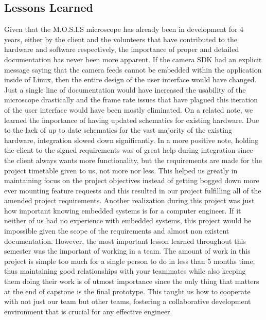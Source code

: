 \subsection{Lessons Learned}
Given that the M.O.S.I.S microscope has already been in development for 4 years, either by the client and the volunteers that have contributed to the hardware and software respectively, the importance of proper and detailed documentation has never been more apparent. If the camera SDK had an explicit message saying that the camera feeds cannot be embedded within the application inside of Linux, then the entire design of the user interface would have changed. Just a single line of documentation would have increased the usability of the microscope drastically and the frame rate issues that have plagued this iteration of the user interface would have been mostly eliminated. On a related note, we learned the importance of having updated schematics for existing hardware. Due to the lack of up to date schematics for the vast majority of the existing hardware, integration slowed down significantly. In a more positive note, holding the client to the signed requirements was of great help during integration since the client always wants more functionality, but the requirements are made for the project timetable given to us, not more nor less. This helped us greatly in maintaining focus on the project objectives instead of getting bogged down more ever mounting feature requests and this resulted in our project fulfilling all of the amended project requirements. Another realization during this project was just how important knowing embedded systems is for a computer engineer. If it neither of us had no experience with embedded systems, this project would be impossible given the scope of the requirements and almost non existent documentation. However, the most important lesson learned throughout this semester was the important of working in a team. The amount of work in this project is simple too much for a single person to do in less than 5 months time, thus maintaining good relationships with your teammates while also keeping them doing their work is of utmost importance since the only thing that matters at the end of capstone is the final prototype. This taught us how to cooperate with not just our team but other teams, fostering a collaborative development environment that is crucial for any effective engineer.